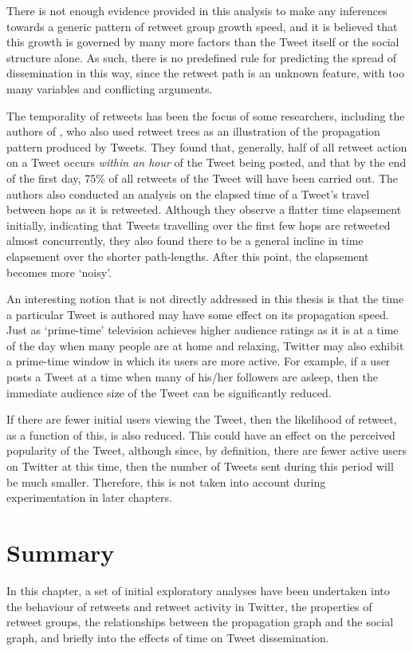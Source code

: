 There is not enough evidence provided in this analysis to make any inferences towards a generic pattern of retweet group growth speed, and it is believed that this growth is governed by many more factors than the Tweet itself or the social structure alone. As such, there is no predefined rule for predicting the spread of dissemination in this way, since the retweet path is an unknown feature, with too many variables and conflicting arguments.

The temporality of retweets has been the focus of some researchers, including the authors of \cite{kwak10}, who also used retweet trees as an illustration of the propagation pattern produced by Tweets. They found that, generally, half of all retweet action on a Tweet occurs \textit{within an hour} of the Tweet being posted, and that by the end of the first day, 75\% of all retweets of the Tweet will have been carried out. The authors also conducted an analysis on the elapsed time of a Tweet's travel between hops as it is retweeted. Although they observe a flatter time elapsement initially, indicating that Tweets travelling over the first few hops are retweeted almost concurrently, they also found there to be a general incline in time elapsement over the shorter path-lengths. After this point, the elapsement becomes more `noisy'. 

An interesting notion that is not directly addressed in this thesis is that the time a particular Tweet is authored may have some effect on its propagation speed. Just as `prime-time' television achieves higher audience ratings as it is at a time of the day when many people are at home and relaxing, Twitter may also exhibit a prime-time window in which its users are more active. For example, if a user posts a Tweet at a time when many of his/her followers are asleep, then the immediate audience size of the Tweet can be significantly reduced.

If there are fewer initial users viewing the Tweet, then the likelihood of retweet, as a function of this, is also reduced. This could have an effect on the perceived popularity of the Tweet, although since, by definition, there are fewer active users on Twitter at this time, then the number of Tweets sent during this period will be much smaller. Therefore, this is not taken into account during experimentation in later chapters.


\section{Summary}
In this chapter, a set of initial exploratory analyses have been undertaken into the behaviour of retweets and retweet activity in Twitter, the properties of retweet groups, the relationships between the propagation graph and the social graph, and briefly into the effects of time on Tweet dissemination.

